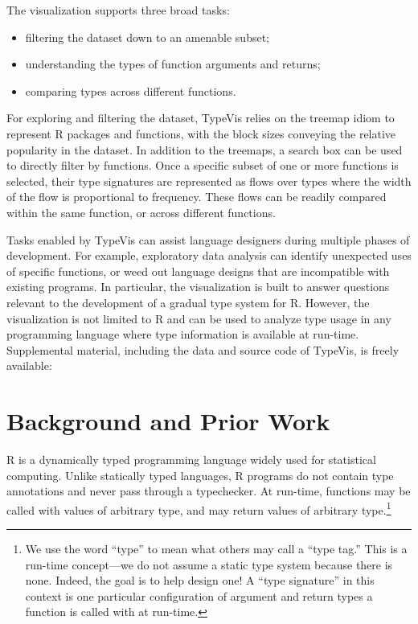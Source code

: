 \documentclass{vgtc}                          %
\newcommand{\typevis}{{\sc TypeVis}\xspace}
\begin{document}
The visualization supports three broad tasks:
\begin{itemize}
  \item filtering the dataset down to an amenable subset;
  \item understanding the types of function arguments and returns;
  \item comparing types across different functions.
\end{itemize}
For exploring and filtering the dataset, \typevis relies on the treemap idiom
to represent R packages and functions, with the block sizes conveying
the relative popularity in the dataset.
In addition to the treemaps, a search box can be used to directly filter
by functions.
Once a specific subset of one or more functions is selected,
their type signatures are represented as flows over types
where the width of the flow is proportional to frequency.
These flows can be readily compared within the same function,
or across different functions.

Tasks enabled by \typevis can assist language designers
during multiple phases of development.
For example, exploratory data analysis can identify unexpected uses
of specific functions, or weed out language designs
that are incompatible with existing programs.
In particular, the visualization is built to answer questions
relevant to the development of a gradual type system for R.
However, the visualization is not limited to R and can be used to
analyze type usage in any programming language where type information
is available at run-time.
Supplemental material, including the data and source code of
\typevis, is freely available: 


\section{Background and Prior Work}

R is a dynamically typed programming language widely used for
statistical computing. Unlike statically typed languages,
R programs do not contain type annotations
and never pass through a typechecker.
At run-time,
functions may be called with values of arbitrary type,
and may return values of arbitrary type.\footnote{
  We use the word ``type'' to mean what others may call a ``type tag.''
  This is a run-time concept---we do not assume a static type system
  because there is none. Indeed, the goal is to help design one!
  A ``type signature'' in this context is one particular configuration
  of argument and return types a function is called with at run-time.
}
\end{document}
